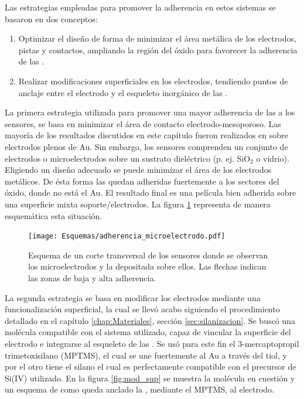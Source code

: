              Las estrategias empleadas para promover la adherencia en estos sistemas se basaron en dos conceptos:
				\begin{enumerate}

					\item Optimizar el diseño de forma de minimizar el área metálica de los electrodos, pistas y contactos, ampliando la región del óxido para favorecer la adherencia de las \pdm.

					\item Realizar modificaciones superficiales en los electrodos, tendiendo puntos de anclaje entre el electrodo y el esqueleto inorgánico de las \pdm.

					\end{enumerate}
			
			 La primera estrategia utilizada para promover una mayor adherencia de las \pdm\space a los sensores, se basa en minimizar el área de contacto electrodo-mesoporoso. Las mayoría de los resultados discutidos en este capítulo fueron realizados en \pdm\space sobre electrodos plenos de Au. Sin embargo, los sensores comprenden un conjunto de electrodos o microelectrodos sobre un sustrato dieléctrico (p. ej. SiO$_2$ o vidrio). Eligiendo un diseño adecuado se puede minimizar el área de los electrodos metálicos. De ésta forma las \pdm\space quedan adheridas fuertemente a los sectores del óxido, donde no está el Au. El resultado final es una película bien adherida sobre una superficie mixta soporte/electrodos.  La figura \ref{fig:adherencia_microelectrodo} representa de manera esquemática esta situación.
			
				\begin{figure}[!ht]
					\begin{center}
					\texttt{[image: Esquemas/adherencia\_microelectrodo.pdf]}
					\caption[Adherencia a los microelectrodos.]{Esquema de un corte transversal de los sensores donde se observan los microelectrodos y la \pdm\space depositada sobre ellos. Las flechas indican las zonas de baja y alta adherencia.}
					\label{fig:adherencia_microelectrodo}
					\end{center}
					\end{figure}
					
					
			 La segunda estrategia se basa en modificar los electrodos mediante una funcionalización superficial, la cual se llevó acabo siguiendo el procedimiento detallado en el capítulo \ref{chap:Materiales}, sección \ref{sec:silanizacion}. Se buscó una molécula compatible con el sistema utilizado, capaz de vincular la superficie del electrodo e integrarse al esqueleto de las \pdm. Se usó para este fin el 3-mercaptopropil trimetoxisilano (MPTMS), el cual se une fuertemente al Au a través del tiol\cite{Gosser,Byun2013}, y por el otro tiene el silano el cual es perfectamente compatible con el precursor de Si(IV) utilizado\cite{Wu2014,Wu2013,Chen2011}. En la figura \ref{fig:mod_sup} se muestra la molécula en cuestión y un esquema de como queda anclado la \pdm, mediante el MPTMS, al electrodo.
		

